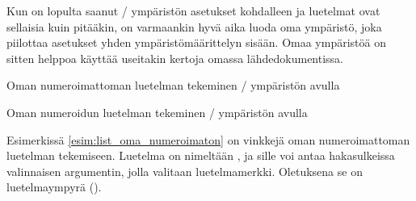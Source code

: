 Kun on lopulta saanut \-/ ympäristön asetukset
kohdalleen ja luetelmat ovat sellaisia kuin pitääkin, on varmaankin hyvä
aika luoda oma ympäristö, joka piilottaa asetukset yhden
ympäristömäärittelyn sisään. Omaa ympäristöä on sitten helppoa käyttää
useitakin kertoja omassa lähdedokumentissa.

\begin{esimerkki*}

\begin{koodilohko}
  \newenvironment{numeroimaton}[1][\textbullet]{%
    \begin{list}{#1}{
        \setlength{\leftmargin}{1.1em}
        \setlength{\labelsep}{.2em}
        \setlength{\itemsep}{.4ex plus .1ex}
        \setlength{\parsep}{.2ex}
      }
    }{\end{list}}
\end{koodilohko}
\caption{Oman numeroimattoman luetelman tekeminen \-/
  ympäristön avulla}
\label{esim:list_oma_numeroimaton}
\end{esimerkki*}

\begin{esimerkki*}

\begin{koodilohko}
  \newenvironment{numeroitu}[1][0]{%
    \begin{list}{\arabic{enumi}.}{
        \usecounter{enumi}
        \setcounter{enumi}{#1}
        \renewcommand{\makelabel}[1]{\hfill\bfseries\large ##1}
        \setlength{\leftmargin}{2em}
        \setlength{\labelsep}{.5em}
        \setlength{\itemsep}{.4ex plus .1ex}
        \setlength{\parsep}{.2ex}
      }
    }{\end{list}}
\end{koodilohko}
\caption{Oman numeroidun luetelman tekeminen \-/
  ympäristön avulla}
\label{esim:list_oma_numeroitu}
\end{esimerkki*}

Esimerkissä \ref{esim:list_oma_numeroimaton} on vinkkejä oman
numeroimattoman luetelman tekemiseen. Luetelma on nimeltään
, ja sille voi antaa hakasulkeissa valinnaisen
argumentin, jolla valitaan luetelmamerkki. Oletuksena se on
luetelmaympyrä ().

